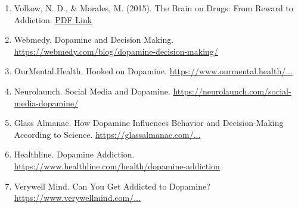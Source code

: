 \documentclass[a4paper,10pt,twocolumn]{memoir}
\begin{document}
\begin{enumerate}
    \item Volkow, N. D., \& Morales, M. (2015). The Brain on Drugs: From Reward to Addiction. \href{https://www.cell.com/neuron/pdf/S0896-6273(15)00133-6.pdf}{PDF Link}
    \item Webmedy. Dopamine and Decision Making. \href{https://webmedy.com/blog/dopamine-decision-making/}{https://webmedy.com/blog/dopamine-decision-making/}
    \item OurMental.Health. Hooked on Dopamine. \href{https://www.ourmental.health/screen-time-sanity/hooked-on-dopamine-how-social-media-hijacks-your-brain}{https://www.ourmental.health/...}
    \item Neurolaunch. Social Media and Dopamine. \href{https://neurolaunch.com/social-media-dopamine/}{https://neurolaunch.com/social-media-dopamine/}
    \item Glass Almanac. How Dopamine Influences Behavior and Decision-Making According to Science. \href{https://glassalmanac.com/how-dopamine-influences-behavior-and-decision-making-according-to-science/}{https://glassalmanac.com/...}
    \item Healthline. Dopamine Addiction. \href{https://www.healthline.com/health/dopamine-addiction}{https://www.healthline.com/health/dopamine-addiction}
    \item Verywell Mind. Can You Get Addicted to Dopamine? \href{https://www.verywellmind.com/can-you-get-addicted-to-dopamine-5207433}{https://www.verywellmind.com/...}
\end{enumerate} 

\clearpage


\end{document}
